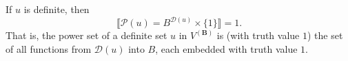 If $u$ is definite, then
$$\llbracket \mathcal{P}(u) = B^{\mathcal{D}(u)} \times \{1\} \rrbracket = 1.$$
That is, the power set of a definite set $u$ in $V^{(\mathbf{B})}$ is (with truth value $1$) the set of all functions from $\mathcal{D}(u)$ into $B$, each embedded with truth value $1$.
